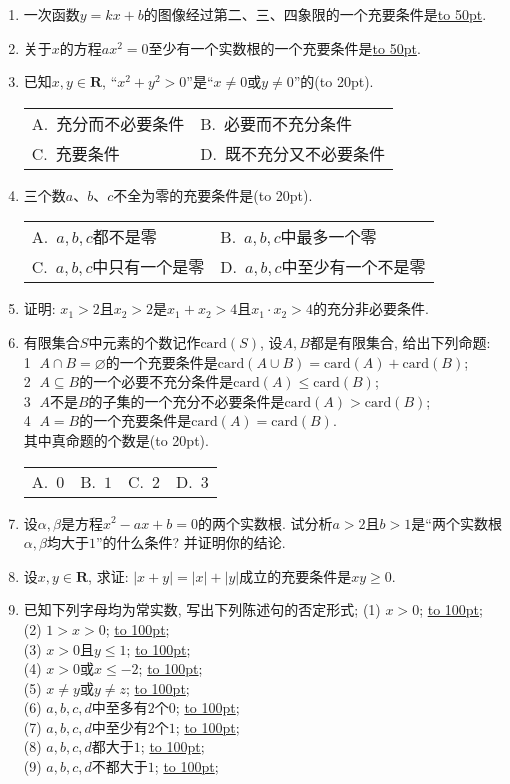 \documentclass[10pt,a4paper]{article}
\newcommand{\blank}[1]{\underline{\hbox to #1pt{}}}
\newcommand{\bracket}[1]{(\hbox to #1pt{})}
\newcommand{\twoch}[4]{\par\begin{tabular}{p{.46\textwidth}p{.46\textwidth}}
A.~#1& B.~#2\\
C.~#3& D.~#4
\end{tabular}}
\newcommand{\fourch}[4]{\par\begin{tabular}{p{.23\textwidth}p{.23\textwidth}p{.23\textwidth}p{.23\textwidth}}
A.~#1 &B.~#2& C.~#3& D.~#4
\end{tabular}}
\begin{document}
\begin{enumerate}[1.]
\item 一次函数$y=kx+b$的图像经过第二、三、四象限的一个充要条件是\blank{50}.
\item 关于$x$的方程$ax^2=0$至少有一个实数根的一个充要条件是\blank{50}.
\item 已知$x,y\in \mathbf{R}$, ``$x^2+y^2>0$''是``$x\ne 0$或$y\ne 0$''的\bracket{20}.
\twoch{充分而不必要条件}{必要而不充分条件}{充要条件}{既不充分又不必要条件}
\item 三个数$a$、$b$、$c$不全为零的充要条件是\bracket{20}.
\twoch{$a,b,c$都不是零}{$a,b,c$中最多一个零}{$a,b,c$中只有一个是零}{$a,b,c$中至少有一个不是零}
\item 证明: $x_1>2$且$x_2>2$是$x_1+x_2>4$且$x_1\cdot x_2>4$的充分非必要条件.
\item 有限集合$S$中元素的个数记作$\mathrm{card}(S)$, 设$A,B$都是有限集合, 给出下列命题:\\
\textcircled{1} $A\cap B=\varnothing$的一个充要条件是$\mathrm{card}(A\cup B)=\mathrm{card}(A)+\mathrm{card}(B)$;\\
\textcircled{2} $A\subseteq B$的一个必要不充分条件是$\mathrm{card}(A)\le \mathrm{card}(B)$; \\
\textcircled{3} $A$不是$B$的子集的一个充分不必要条件是$\mathrm{card}(A)>\mathrm{card}(B)$;\\ 
\textcircled{4} $A=B$的一个充要条件是$\mathrm{card}(A)=\mathrm{card}(B)$.\\ 
其中真命题的个数是\bracket{20}.
\fourch{$0$}{$1$}{$2$}{$3$}
\item 设$\alpha,\beta$是方程$x^2-ax+b=0$的两个实数根. 试分析$a>2$且$b>1$是``两个实数根$\alpha,\beta$均大于$1$''的什么条件? 并证明你的结论.
\item 设$x,y\in \mathbf{R}$, 求证: $|x+y|=|x|+|y|$成立的充要条件是$xy\ge 0$.
\item 已知下列字母均为常实数, 写出下列陈述句的否定形式;
(1) $x>0$; \blank{100};\\
(2) $1>x>0$; \blank{100};\\
(3) $x>0$且$y\le 1$; \blank{100};\\
(4) $x>0$或$x\le -2$; \blank{100};\\
(5) $x\ne y$或$y\ne z$; \blank{100};\\
(6) $a,b,c,d$中至多有$2$个$0$; \blank{100};\\
(7) $a,b,c,d$中至少有$2$个$1$; \blank{100};\\
(8) $a,b,c,d$都大于$1$; \blank{100};\\
(9) $a,b,c,d$不都大于$1$; \blank{100};\\

\end{enumerate}
\end{document}
